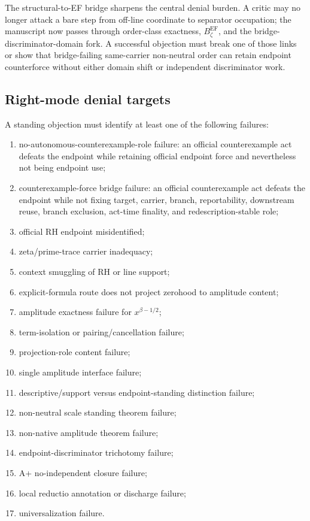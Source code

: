 \documentclass[11pt]{article}
\newcommand{\BzetaEF}{B^{\mathrm{EF}}_{\zeta}}
\begin{document}
The structural-to-EF bridge sharpens the central denial burden.  A critic may no longer attack a bare step from off-line coordinate to separator occupation; the manuscript now passes through order-class exactness, \(\BzetaEF\), and the bridge-discriminator-domain fork.  A successful objection must break one of those links or show that bridge-failing same-carrier non-neutral order can retain endpoint counterforce without either domain shift or independent discriminator work.


\subsection{Right-mode denial targets}

A standing objection must identify at least one of the following failures:
\begin{enumerate}
\item no-autonomous-counterexample-role failure: an official counterexample act defeats the endpoint while retaining official endpoint force and nevertheless not being endpoint use;
\item counterexample-force bridge failure: an official counterexample act defeats the endpoint while not fixing target, carrier, branch, reportability, downstream reuse, branch exclusion, act-time finality, and redescription-stable role;
\item official RH endpoint misidentified;
\item zeta/prime-trace carrier inadequacy;
\item context smuggling of RH or line support;
\item explicit-formula route does not project zerohood to amplitude content;
\item amplitude exactness failure for \(x^{\beta-1/2}\);
\item term-isolation or pairing/cancellation failure;
\item projection-role content failure;
\item single amplitude interface failure;
\item descriptive/support versus endpoint-standing distinction failure;
\item non-neutral scale standing theorem failure;
\item non-native amplitude theorem failure;
\item endpoint-discriminator trichotomy failure;
\item A+ no-independent closure failure;
\item local reductio annotation or discharge failure;
\item universalization failure.
\end{enumerate}
\end{document}
